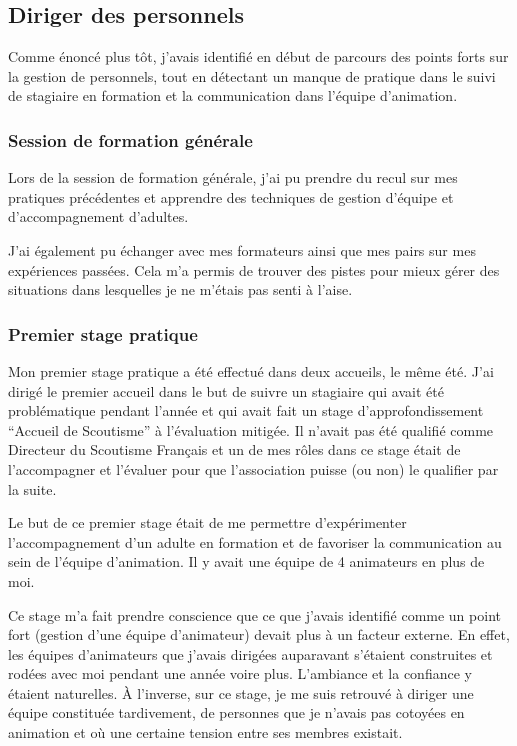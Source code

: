 \documentclass[titlepage,11pt,a4paper]{article}
\begin{document}
\subsection{Diriger des personnels}

Comme énoncé plus tôt, j'avais identifié en début de parcours des points forts sur la
gestion de personnels, tout en détectant un manque de pratique dans le suivi de stagiaire
en formation et la communication dans l'équipe d'animation.

\subsubsection{Session de formation générale}

Lors de la session de formation générale, j'ai pu prendre du recul sur mes pratiques
précédentes et apprendre des techniques de gestion d'équipe et d'accompagnement
d'adultes.

J'ai également pu échanger avec mes formateurs ainsi que mes pairs sur mes expériences
passées. Cela m'a permis de trouver des pistes pour mieux gérer des situations dans lesquelles
je ne m'étais pas senti à l'aise.

\subsubsection{Premier stage pratique}

Mon premier stage pratique a été effectué dans deux accueils, le même été. J'ai dirigé le
premier accueil dans le but de suivre un stagiaire qui avait été problématique pendant
l'année et qui avait fait un stage d'approfondissement ``Accueil de Scoutisme'' à
l'évaluation mitigée. Il n'avait pas été qualifié comme Directeur du Scoutisme Français et
un de mes rôles dans ce stage était de l'accompagner et l'évaluer pour que l'association puisse (ou
non) le qualifier par la suite.

Le but de ce premier stage était de me permettre d'expérimenter l'accompagnement d'un
adulte en formation et de favoriser la communication au sein de l'équipe d'animation. Il y
avait une équipe de 4 animateurs en plus de moi.

Ce stage m'a fait prendre conscience que ce que j'avais identifié comme un point fort
(gestion d'une équipe d'animateur) devait plus à un facteur externe. En effet, les équipes
d'animateurs que j'avais dirigées auparavant s'étaient construites et rodées avec moi pendant
une année voire plus. L'ambiance et la confiance y étaient naturelles. À l'inverse, sur ce
stage, je me suis retrouvé à diriger une équipe constituée tardivement, de personnes que
je n'avais pas cotoyées en animation et où une certaine tension entre ses membres
existait.
\end{document}
